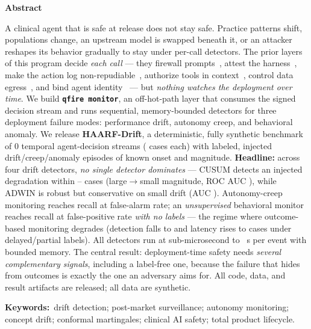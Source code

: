 \documentclass[11pt]{article}
\providecommand{\NumPrompts}{0}
\begin{document}
\vspace{0.5em}
\begin{tcolorbox}[breakable, enhanced jigsaw, colback=black!4, colframe=black!4,
  arc=5pt, boxrule=0pt, left=16pt, right=16pt, top=10pt, bottom=10pt]
\setlength{\parskip}{0pt}
{\centering\large\bfseries Abstract\par}
\smallskip
\fontsize{9.5}{11.3}\selectfont
A clinical agent that is safe at release does not stay safe. Practice patterns shift,
populations change, an upstream model is swapped beneath it, or an attacker reshapes
its behavior gradually to stay under per-call detectors. The prior layers of this
program decide \emph{each call} --- they firewall prompts~\cite{schwoebel2026qfire}, attest the
harness~\cite{pristineweights2026}, make the action log non-repudiable~\cite{tamperaudit2026},
authorize tools in context~\cite{policy2026}, control data egress~\cite{egress2026}, and
bind agent identity~\cite{multiagent2026} --- but \emph{nothing watches the deployment
over time}. We build \textbf{\texttt{qfire monitor}}, an off-hot-path layer that consumes
the signed decision stream and runs sequential, memory-bounded detectors for three
deployment failure modes: performance drift, autonomy creep, and behavioral anomaly. We
release \textbf{HAARF-Drift}, a deterministic, fully synthetic benchmark of \NumPrompts{}
temporal agent-decision streams (\StreamLen{} cases each) with labeled, injected
drift/creep/anomaly episodes of known onset and magnitude. \textbf{Headline:} across four
drift detectors, \emph{no single detector dominates} --- CUSUM detects an injected
degradation within \CusumLatLarge{}--\CusumLatSmall{} cases (large$\to$small magnitude,
ROC AUC \CusumAUC{}), while ADWIN is robust but conservative on small drift
(AUC \AdwinAUC{}). Autonomy-creep monitoring reaches \AutoRecall{} recall at \AutoFAR{}
false-alarm rate; an \emph{unsupervised} behavioral monitor reaches \BehRecall{} recall at
\BehFPRop{} false-positive rate \emph{with no labels} --- the regime where outcome-based
monitoring degrades (detection falls to \EtwoSparseRate{} and latency rises to
\EtwoMaxLat{} cases under delayed/partial labels). All detectors run at sub-microsecond
to \OvDist~\textmu s per event with bounded memory. The central result: deployment-time
safety needs \emph{several complementary signals}, including a label-free one, because
the failure that hides from outcomes is exactly the one an adversary aims for. All code,
data, and result artifacts are released; all data are synthetic.

\medskip
\noindent\textbf{Keywords:}~drift detection; post-market surveillance; autonomy
monitoring; concept drift; conformal martingales; clinical AI safety; total product
lifecycle.


\end{tcolorbox}
\end{document}
